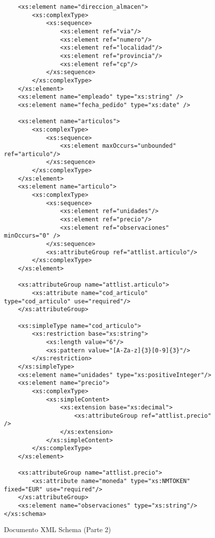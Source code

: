 \begin{figure}[H]
    \begin{tcolorbox}[sharp corners, colback=yellow!30, colframe=white!20]
        \scriptsize
        \begin{verbatim}
    <xs:element name="direccion_almacen">
        <xs:complexType>
            <xs:sequence>
                <xs:element ref="via"/>
                <xs:element ref="numero"/>
                <xs:element ref="localidad"/>
                <xs:element ref="provincia"/>
                <xs:element ref="cp"/>
            </xs:sequence>
        </xs:complexType>
    </xs:element>
    <xs:element name="empleado" type="xs:string" />
    <xs:element name="fecha_pedido" type="xs:date" />

    <xs:element name="articulos">
        <xs:complexType>
            <xs:sequence>
                <xs:element maxOccurs="unbounded" ref="articulo"/>
            </xs:sequence>
        </xs:complexType>
    </xs:element>
    <xs:element name="articulo">
        <xs:complexType>
            <xs:sequence>
                <xs:element ref="unidades"/>
                <xs:element ref="precio"/>
                <xs:element ref="observaciones" minOccurs="0" />
            </xs:sequence>
            <xs:attributeGroup ref="attlist.articulo"/>
        </xs:complexType>
    </xs:element>

    <xs:attributeGroup name="attlist.articulo">
        <xs:attribute name="cod_articulo" type="cod_articulo" use="required"/>
    </xs:attributeGroup>

    <xs:simpleType name="cod_articulo">
        <xs:restriction base="xs:string">
            <xs:length value="6"/>
            <xs:pattern value="[A-Za-z]{3}[0-9]{3}"/>
        </xs:restriction>
    </xs:simpleType>
    <xs:element name="unidades" type="xs:positiveInteger"/>
    <xs:element name="precio">
        <xs:complexType>
            <xs:simpleContent>
                <xs:extension base="xs:decimal">
                    <xs:attributeGroup ref="attlist.precio" />
                </xs:extension>
            </xs:simpleContent>
        </xs:complexType>
    </xs:element>

    <xs:attributeGroup name="attlist.precio">
        <xs:attribute name="moneda" type="xs:NMTOKEN" fixed="EUR" use="required"/>
    </xs:attributeGroup>
    <xs:element name="observaciones" type="xs:string"/>
</xs:schema>
        \end{verbatim}
    \end{tcolorbox}
    \caption{Documento XML Schema (Parte 2)}
\end{figure}

